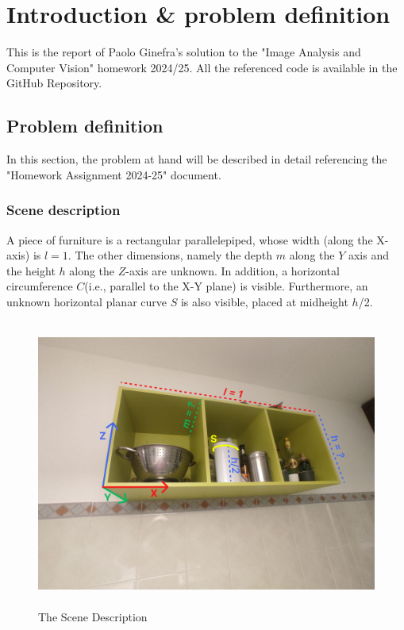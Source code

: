 \chapter*{Introduction \& problem definition}
This is the report of Paolo Ginefra's solution to the "Image Analysis and Computer Vision" homework 2024/25.
All the referenced code is available in the GitHub Repository.

\section{Problem definition}
In this section, the problem at hand will be described in detail referencing the "Homework Assignment 2024-25" document.
\subsection{Scene description}
 A piece of furniture is a rectangular parallelepiped, whose width (along the X-axis) is $l = 1$. 
The other dimensions, namely the depth $m$ along the $Y$ axis and the height $h$ along the $Z$-axis are 
unknown. In addition, a horizontal circumference $C$(i.e., parallel to the X-Y plane) is visible. 
Furthermore, an unknown horizontal planar curve $S$ is also visible, placed at midheight $h$/2. 

\begin{figure}[!ht]
\centering
\includegraphics[height=9.5cm, width=\textwidth, keepaspectratio]{Report/Images/Introduction/SceneDescription.png}
\caption{\label{fig:SceneDescription}The Scene Description}
\end{figure}
